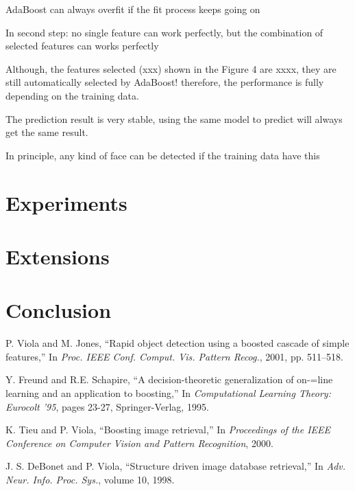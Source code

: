 \documentclass[10pt,twocolumn,letterpaper]{article}
\begin{document}
AdaBoost can always overfit if the fit process keeps going on

In second step: no single feature can work perfectly, but the combination of selected features can works perfectly

Although, the features selected (xxx) shown in the Figure 4 are xxxx, they are still automatically selected by AdaBoost!
therefore, the performance is fully depending on the training data.

The prediction result is very stable, using the same model to predict will always get the same result.

In principle, any kind of face can be detected if the training data have this


\section{Experiments}

\section{Extensions}

%

\section{Conclusion}

\begin{thebibliography}{9}
P. Viola and M. Jones, ``Rapid object detection using a boosted cascade of simple features,''
In \textit{Proc. IEEE Conf. Comput. Vis. Pattern Recog.}, 2001, pp. 511–518.

Y. Freund and R.E. Schapire, ``A decision-theoretic generalization of on-=line learning and an application to boosting,''
In \textit{Computational Learning Theory: Eurocolt '95}, pages 23-27, Springer-Verlag, 1995.

K. Tieu and P. Viola, ``Boosting image retrieval,''
In \textit{Proceedings of the IEEE Conference on Computer Vision and Pattern Recognition}, 2000.

J. S. DeBonet and P. Viola, ``Structure driven image database retrieval,''
In \textit{Adv. Neur. Info. Proc. Sys.}, volume 10, 1998.


\end{thebibliography}
\end{document}
